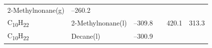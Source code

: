 \documentclass[
  9pt,
]{extbook}
\theoremstyle{definition}
\theoremstyle{definition}
\theoremstyle{definition}
\theoremstyle{remark}
\begin{document}
\begin{longtable}[]{@{}llllll@{}}
\begin{minipage}[t]{0.17\columnwidth}
2-Methylnonane(g)\strut
\end{minipage} & \begin{minipage}[t]{0.15\columnwidth}\raggedright
--260.2\strut
\end{minipage} & \begin{minipage}[t]{0.15\columnwidth}\raggedright
\strut
\end{minipage} & \begin{minipage}[t]{0.14\columnwidth}\raggedright
\strut
\end{minipage} & \begin{minipage}[t]{0.14\columnwidth}\raggedright
\strut
\end{minipage}\tabularnewline
\begin{minipage}[t]{0.07\columnwidth}\raggedright
C\textsubscript{10}H\textsubscript{22}\strut
\end{minipage} & \begin{minipage}[t]{0.17\columnwidth}\raggedright
2-Methylnonane(l)\strut
\end{minipage} & \begin{minipage}[t]{0.15\columnwidth}\raggedright
--309.8\strut
\end{minipage} & \begin{minipage}[t]{0.15\columnwidth}\raggedright
\strut
\end{minipage} & \begin{minipage}[t]{0.14\columnwidth}\raggedright
420.1\strut
\end{minipage} & \begin{minipage}[t]{0.14\columnwidth}\raggedright
313.3\strut
\end{minipage}\tabularnewline
\begin{minipage}[t]{0.07\columnwidth}\raggedright
C\textsubscript{10}H\textsubscript{22}\strut
\end{minipage} & \begin{minipage}[t]{0.17\columnwidth}\raggedright
Decane(l)\strut
\end{minipage} & \begin{minipage}[t]{0.15\columnwidth}\raggedright
--300.9\strut
\end{minipage} & \begin{minipage}[t]{0.15\columnwidth}\raggedright
\strut
\end{minipage} & \begin{minipage}[t]{0.14\columnwidth}\raggedright
\strut
\end{minipage} & \begin{minipage}[t]{0.14\columnwidth}\raggedright

\end{minipage}
\end{longtable}
\end{document}
